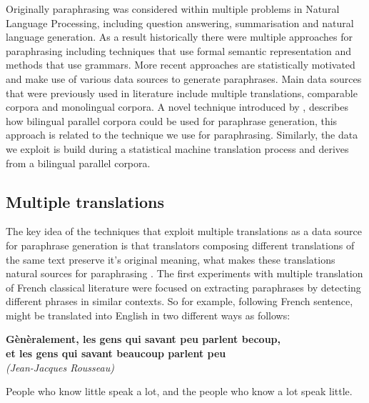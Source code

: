 Originally paraphrasing was considered within multiple problems in Natural Language Processing, including question answering, summarisation and natural language generation. As a result historically there were multiple approaches for paraphrasing including techniques that use formal semantic representation and methods that use grammars. More recent approaches are statistically motivated and make use of various data sources to generate paraphrases. 
Main data sources that were previously used in literature include multiple translations, comparable corpora and monolingual corpora. A novel technique introduced by \cite{Callison-Burch2007}, describes how bilingual parallel corpora could be used for paraphrase generation, this approach is related to the technique we use for paraphrasing. Similarly, the data we exploit is build during a statistical machine translation process and derives from a bilingual parallel corpora.

\subsection{Multiple translations}

The key idea of the techniques that exploit multiple translations as a data source for paraphrase generation is that translators composing different translations of the same text preserve it's original meaning, what makes these translations natural sources for paraphrasing \citep{barzilay2001extracting}. The first experiments with multiple translation of French classical literature were focused on extracting paraphrases by detecting different phrases in similar contexts. So for example, following French sentence, might be translated into English in two different ways as follows:

\begin{center}
\begin{Large}
\textbf{G\`{e}n\`{e}ralement, les gens qui savant peu parlent becoup,\\ et les gens qui savant beaucoup parlent peu}
\\
\small{\textit{(Jean-Jacques Rousseau)}}
\end{Large}
\end{center}

\begin{center}
\begin{Large}
People who know little speak a lot, and the people who know a lot speak little. 
\end{Large}
\end{center}

